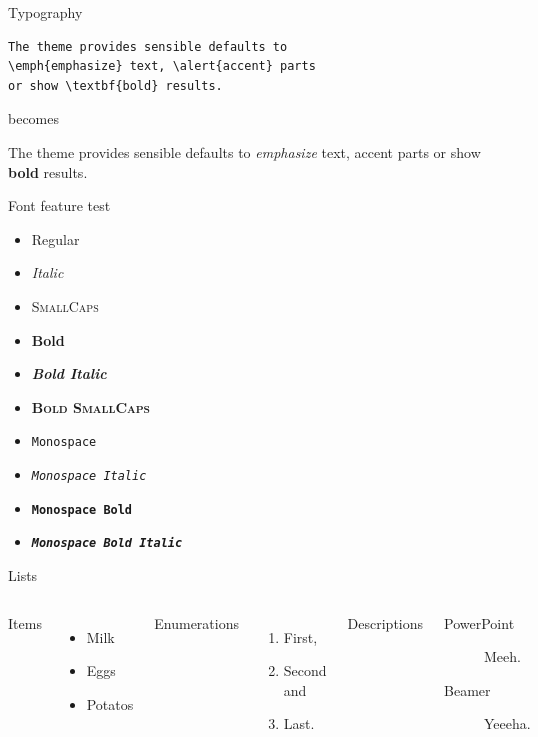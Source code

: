 \begin{frame}[fragile]{Typography}
      \begin{verbatim}The theme provides sensible defaults to
\emph{emphasize} text, \alert{accent} parts
or show \textbf{bold} results.\end{verbatim}

  \begin{center}becomes\end{center}

  The theme provides sensible defaults to \emph{emphasize} text,
  \alert{accent} parts or show \textbf{bold} results.
\end{frame}

\begin{frame}{Font feature test}
  \begin{itemize}
    \item Regular
    \item \textit{Italic}
    \item \textsc{SmallCaps}
    \item \textbf{Bold}
    \item \textbf{\textit{Bold Italic}}
    \item \textbf{\textsc{Bold SmallCaps}}
    \item \texttt{Monospace}
    \item \texttt{\textit{Monospace Italic}}
    \item \texttt{\textbf{Monospace Bold}}
    \item \texttt{\textbf{\textit{Monospace Bold Italic}}}
  \end{itemize}
\end{frame}


\begin{frame}{Lists}
  \begin{columns}[T,onlytextwidth]
      Items
      \begin{itemize}
        \item Milk \item Eggs \item Potatos
      \end{itemize}

      Enumerations
      \begin{enumerate}
        \item First, \item Second and \item Last.
      \end{enumerate}

      Descriptions
      \begin{description}
        \item[PowerPoint] Meeh. \item[Beamer] Yeeeha.
      \end{description}
  \end{columns}
\end{frame}

